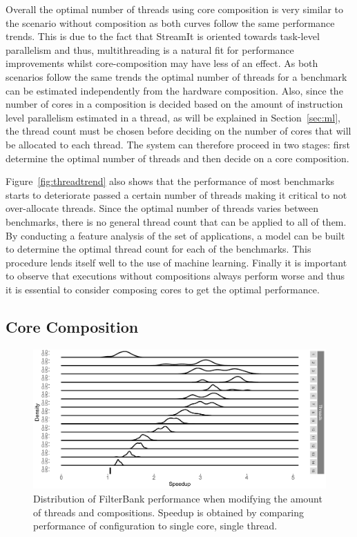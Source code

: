 Overall the optimal number of threads using core composition is very similar to the scenario without composition as both curves follow the same performance trends.
This is due to the fact that StreamIt is oriented towards task-level parallelism and thus, multithreading is a natural fit for performance improvements whilst core-composition may have less of an effect.
As both scenarios follow the same trends the optimal number of threads for a benchmark can be estimated independently from the hardware composition.
Also, since the number of cores in a composition is decided based on the amount of instruction level parallelism estimated in a thread, as will be explained in Section~\ref{sec:ml}, the thread count must be chosen before deciding on the number of cores that will be allocated to each thread.
The system can therefore proceed in two stages: first determine the optimal number of threads and then decide on a core composition.

Figure~\ref{fig:threadtrend} also shows that the performance of most benchmarks starts to deteriorate passed a certain number of threads making it critical to not over-allocate threads.
Since the optimal number of threads varies between benchmarks, there is no general thread count that can be applied to all of them.
By conducting a feature analysis of the set of applications, a model can be built to determine the optimal thread count for each of the benchmarks.
This procedure lends itself well to the use of machine learning.
Finally it is important to observe that executions without compositions always perform worse and thus it is essential to consider composing cores to get the optimal performance.


\subsection{Core Composition}

\begin{figure}[t]
  \includegraphics[width=1\textwidth]{streamit-paper/graphics/filterbank_tot2.pdf}
  \caption{Distribution of FilterBank performance when modifying the amount of threads and compositions. Speedup is obtained by comparing performance of configuration to single core, single thread.}\label{fig:fbtotal}
\end{figure}

